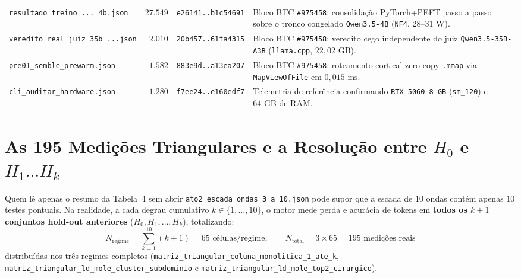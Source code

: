 \documentclass[10pt,a4paper]{article}
\begin{document}
\begin{table}[!htbp]
\begin{tabularx}{\linewidth}{@{}lrrY@{}}
\texttt{resultado\_\allowbreak{}treino\_\allowbreak{}...\_\allowbreak{}4b.json} & $27.549$ & \texttt{e26141..b1c54691} & Bloco BTC \texttt{\#975458}: consolida\c{c}\~ao PyTorch+PEFT passo a passo sobre o tronco congelado \texttt{Qwen3.5-4B} (\texttt{NF4}, $28\text{--}31\text{ W}$). \\
\texttt{veredito\_\allowbreak{}real\_\allowbreak{}juiz\_\allowbreak{}35b\_\allowbreak{}...json} & $2.010$ & \texttt{20b457..61fa4315} & Bloco BTC \texttt{\#975458}: veredito cego independente do juiz \texttt{Qwen3.5-35B-A3B} (\texttt{llama.cpp}, $22,02\text{ GB}$). \\
\texttt{pre01\_\allowbreak{}semble\_\allowbreak{}prewarm.json} & $1.582$ & \texttt{883e9d..a13ea207} & Bloco BTC \texttt{\#975458}: roteamento cortical zero-copy \texttt{.mmap} via \texttt{MapViewOfFile} em $0,015\text{ ms}$. \\
\texttt{cli\_\allowbreak{}auditar\_\allowbreak{}hardware.json} & $1.280$ & \texttt{f7ee24..e160edf7} & Telemetria de refer\^encia confirmando \texttt{RTX 5060 8 GB} (\texttt{sm\_120}) e $64\text{ GB}$ de RAM. \\
\bottomrule
\end{tabularx}
\end{table}

\section{As 195 Medi\c{c}\~oes Triangulares e a Resolu\c{c}\~ao entre \texorpdfstring{$H_0$ e $H_1\dots H_k$}{H0 e H1..Hk}}

Quem l\^e apenas o resumo da Tabela~4 sem abrir \texttt{ato2\_\allowbreak{}escada\_\allowbreak{}ondas\_\allowbreak{}3\_\allowbreak{}a\_\allowbreak{}10.json} pode supor que a escada de $10$ ondas cont\'em apenas $10$ testes pontuais. Na realidade, a cada degrau cumulativo $k \in \{1,\dots,10\}$, o motor mede perda e acur\'acia de tokens em \textbf{todos os $k+1$ conjuntos hold-out anteriores} ($H_0, H_1, \dots, H_k$), totalizando:
\begin{equation}
  N_{\text{regime}} = \sum_{k=1}^{10} (k + 1) = 65 \text{ c\'elulas/regime}, \qquad
  N_{\text{total}} = 3 \times 65 = 195 \text{ medi\c{c}\~oes reais}
\end{equation}
distribu\'idas nos tr\^es regimes completos (\texttt{matriz\_\allowbreak{}triangular\_\allowbreak{}coluna\_\allowbreak{}monolitica\_\allowbreak{}1\_\allowbreak{}ate\_\allowbreak{}k}, \texttt{matriz\_\allowbreak{}triangular\_\allowbreak{}ld\_\allowbreak{}mole\_\allowbreak{}cluster\_\allowbreak{}subdominio} e \texttt{matriz\_\allowbreak{}triangular\_\allowbreak{}ld\_\allowbreak{}mole\_\allowbreak{}top2\_\allowbreak{}cirurgico}).
\end{document}
